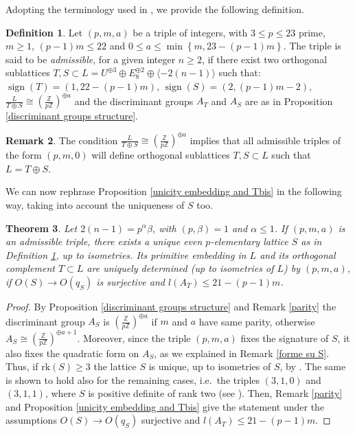\documentclass{amsart}
\newtheorem{theorem}{Theorem}[section]
\theoremstyle{definition}
\newtheorem{rem}[theorem]{Remark}
\newtheorem{defi}[theorem]{Definition}
\newcommand{\ra}{\rightarrow}
\newcommand{\IZ}{\mathbb{Z}}
\newcommand{\rk}{\mathrm{rk}}
\DeclareMathOperator{\signt}{sign}
\begin{document}
Adopting the terminology used in \cite{bcs}, we provide the following definition.

\begin{defi}\label{admissible triple def}
Let $(p,m,a)$ be a triple of integers, with $3 \leq p \leq 23$ prime, $m \geq 1$, $(p-1)m \leq 22$ and $0 \leq a \leq \min\left\{m, 23-(p-1)m \right\}$. The triple is said to be \emph{admissible}, for a given integer $n \geq 2$, if there exist two orthogonal sublattices $T,S \subset L = U^{\oplus 3}\oplus E_8^{\oplus 2} \oplus \langle-2(n-1)\rangle$ such that: $\signt(T) = (1,22-(p-1)m)$, $\signt(S) = (2, (p-1)m-2)$, $\frac{L}{T \oplus S} \cong \left( \frac{\IZ}{p \IZ}\right)^{\oplus a}$ and the discriminant groups $A_T$ and $A_S$ are as in Proposition \ref{discriminant groups structure}.  
\end{defi}

\begin{rem} \label{remark a=0}
The condition $\frac{L}{T \oplus S} \cong \left( \frac{\IZ}{p \IZ}\right)^{\oplus a}$ implies that all admissible triples of the form $(p,m,0)$ will define orthogonal sublattices $T,S \subset L$ such that $L = T \oplus S$.
\end{rem}

We can now rephrase Proposition \ref{unicity embedding and Tbis} in the following way, taking into account the uniqueness of $S$ too.

\begin{theorem}\label{thm: admissible triples}
Let $2(n-1) = p^\alpha \beta$, with $(p, \beta) = 1$ and $\alpha \leq 1$. If $(p,m,a)$ is an admissible triple, there exists a unique even $p$-elementary lattice $S$ as in Definition \ref{admissible triple def}, up to isometries. Its primitive embedding in $L$ and its orthogonal complement $T \subset L$ are uniquely determined (up to isometries of $L$) by $(p,m,a)$, if $O(S)\ra O(q_S)$ is surjective and $l(A_T) \leq 21 - (p-1)m$.
\end{theorem}

\begin{proof}
By Proposition \ref{discriminant groups structure} and Remark \ref{parity} the discriminant group $A_S$ is $\left( \frac{\IZ}{p \IZ}\right)^{\oplus a}$ if $m$ and $a$ have same parity, otherwise $A_S \cong \left( \frac{\IZ}{p \IZ}\right)^{\oplus a+1}$. Moreover, since the triple $(p,m,a)$ fixes the signature of $S$, it also fixes the quadratic form on $A_S$, as we explained in Remark \ref{forme su S}. Thus, if $\rk(S) \geq 3$ the lattice $S$ is unique, up to isometries of $S$, by \cite[Theorem 2.2]{bcs}. The same is shown to hold also for the remaining cases, i.e.\ the triples $(3,1,0)$ and $(3,1,1)$, where $S$ is positive definite of rank two (see \cite[Table 15.1]{conway_sloane}). Then, Remark \ref{parity} and Proposition \ref{unicity embedding and Tbis} give the statement under the assumptions $O(S)\ra O(q_S)$ surjective and $l(A_T) \leq 21 - (p-1)m$.
\end{proof}
\end{document}

